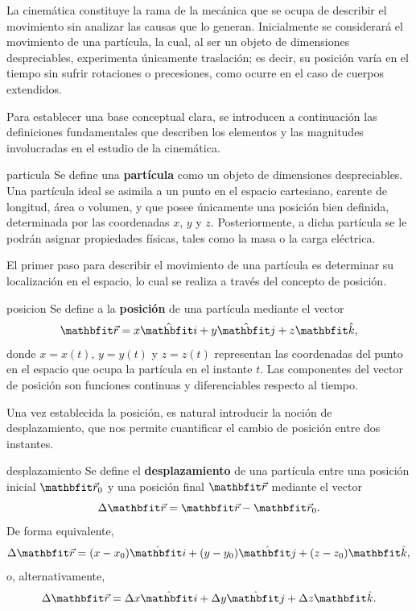 La cinemática constituye la rama de la mecánica que se ocupa de describir el movimiento sin analizar las causas que lo generan. Inicialmente se considerará el movimiento de una partícula, la cual, al ser un objeto de dimensiones despreciables, experimenta únicamente traslación; es decir, su posición varía en el tiempo sin sufrir rotaciones o precesiones, como ocurre en el caso de cuerpos extendidos.

Para establecer una base conceptual clara, se introducen a continuación las definiciones fundamentales que describen los elementos y las magnitudes involucradas en el estudio de la cinemática.

\begin{definition}{}{particula}
    Se define una \textbf{partícula} como un objeto de dimensiones despreciables. Una partícula ideal se asimila a un punto en el espacio cartesiano, carente de longitud, área o volumen, y que posee únicamente una posición bien definida, determinada por las coordenadas $x$, $y$ y $z$. Posteriormente, a dicha partícula se le podrán asignar propiedades físicas, tales como la masa o la carga eléctrica.
\end{definition}

El primer paso para describir el movimiento de una partícula es determinar su localización en el espacio, lo cual se realiza a través del concepto de posición.

\begin{definition}{}{posicion}
    Se define a la \textbf{posición} de una partícula mediante el vector
    $$\vecr = x\veci + y\vecj + z\veck,$$
    donde $x = x(t)$, $y = y(t)$ y $z = z(t)$ representan las coordenadas del punto en el espacio que ocupa la partícula en el instante $t$. Las componentes del vector de posición son funciones continuas y diferenciables respecto al tiempo.
\end{definition}

Una vez establecida la posición, es natural introducir la noción de desplazamiento, que nos permite cuantificar el cambio de posición entre dos instantes.

\begin{definition}{}{desplazamiento}
    Se define el \textbf{desplazamiento} de una partícula entre una posición inicial $\vecr_0$ y una posición final $\vecr$ mediante el vector
    $$\Delta\vecr = \vecr - \vecr_0.$$
    De forma equivalente,
    $$\Delta\vecr = (x - x_0)\veci + (y - y_0)\vecj + (z - z_0)\veck,$$
    o, alternativamente,
    $$\Deltar = \Deltax\veci + \Deltay\vecj + \Deltaz\veck.$$
\end{definition}

